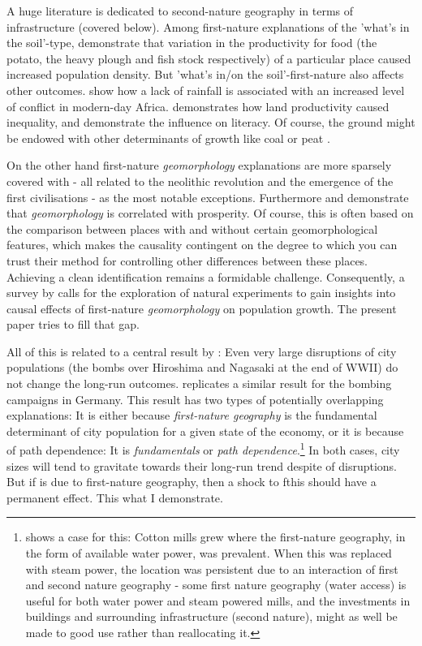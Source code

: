 \documentclass[11pt]{article}
\begin{document}
A huge literature is dedicated to second-nature geography in terms of infrastructure (covered below). Among first-nature explanations of the 'what's in the soil'-type, \cite{Nunn2011a, HeavyPlough2016, Dalgaard2020} demonstrate that variation in the productivity for food (the potato, the heavy plough and fish stock respectively) of a particular place caused increased population density. But 'what's in/on the soil'-first-nature also affects other outcomes.  \cite{Decet2023WaterWars} show how a lack of rainfall is associated with an increased level of conflict in modern-day Africa. \cite{WinnersAndLosers2022} demonstrates how land productivity caused inequality, and \cite{clark2014} demonstrate the influence on literacy. Of course, the ground might be endowed with other determinants of growth like coal \citep{ORourkeCoal2021} or peat \citep{CoalPeatPaper}. 

On the other hand first-nature \textit{geomorphology} explanations are more sparsely covered with \cite{Diamond1997, Allen2023, Matranga2024} - all related to the neolithic revolution and the emergence of the first civilisations - as the most notable exceptions. Furthermore \cite{Henderson2018satelite} and \cite{Bosker2017} demonstrate that \textit{geomorphology} is correlated with prosperity. Of course, this is often based on the comparison between places with and without certain geomorphological features, which makes the causality contingent on the degree to which you can trust their method for controlling other differences between these places. Achieving a clean identification remains a formidable challenge. Consequently, a survey by \cite{Bosker2022} calls for the exploration of natural experiments to gain insights into causal effects of first-nature \textit{geomorphology} on population growth. The present paper tries to fill that gap.

All of this is related to a central result by \cite{Davis2002}: Even very large disruptions of city populations (the bombs over Hiroshima and Nagasaki at the end of WWII) do not change the long-run outcomes. \cite{Brakman2004Bombs} replicates a similar result for the bombing campaigns in Germany. This result has two types of potentially overlapping explanations: It is either because \textit{first-nature geography} is the fundamental determinant of city population for a given state of the economy, or it is because of path dependence: It is \textit{fundamentals} or \textit{path dependence}.\footnote{\cite{CraftsWolf2014} shows a case for this: Cotton mills grew where the first-nature geography, in the form of available water power, was prevalent. When this was replaced with steam power, the location was persistent due to an interaction of first and second nature geography - some first nature geography (water access) is useful for both water power and steam powered mills, and the investments in buildings and surrounding infrastructure (second nature), might as well be made to good use rather than reallocating it. } In both cases, city sizes will tend to gravitate towards their long-run trend despite of disruptions. But if is due to first-nature geography, then a shock to fthis should have a permanent effect. This what I demonstrate.
\end{document}
